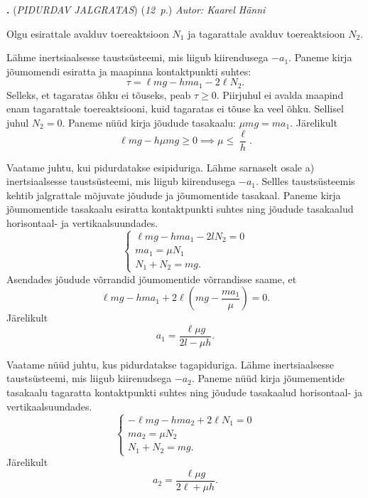 \documentclass[11pt,a5paper]{article}
\newcommand{\numb}[1]{\vspace{5pt}\textbf{\large #1}}
\newcommand{\nimi}[1]{(\textsl{\small #1})}
\newcommand{\punktid}[1]{(\emph{#1~p.})}
\newcounter{ylesanne}
\newcommand{\yl}[1]{\addtocounter{ylesanne}{1}\numb{\theylesanne.} \nimi{#1} \newblock{}}
\newcommand{\autor}[1]{\emph{ Autor: #1}}%
\begin{document}
\yl{PIDURDAV JALGRATAS}
\punktid{12} \autor{Kaarel Hänni}

Olgu esirattale avalduv toereaktsioon $N_1$ ja tagarattale avalduv toereaktsioon $N_2$.

\osa Lähme inertsiaalsesse taustsüsteemi, mis liigub kiirendusega $-a_1$. Paneme kirja jõumomendi esiratta ja maapinna kontaktpunkti suhtes:
\begin{equation}
  \tau=\ell mg-h m a_1 - 2\ell N_2.
\end{equation}
Selleks, et tagaratas õhku ei tõuseks, peab $\tau \geq 0$. Piirjuhul ei avalda maapind enam tagarattale toereaktsiooni, kuid tagaratas ei tõuse ka veel õhku. Sellisel juhul $N_2=0$. Paneme nüüd kirja jõudude tasakaalu: $\mu mg = m a_1$. Järelikult
\begin{equation}
\ell mg-h \mu mg \geq 0 \implies \mu \leq \frac{\ell}{h}.
\end{equation}

\osa Vaatame juhtu, kui pidurdatakse esipiduriga. Lähme sarnaselt osale a) inertsiaalsesse taustsüsteemi, mis liigub kiirendusega $-a_1$.  Sellles taustsüsteemis kehtib jalgrattale mõjuvate jõudude ja jõumomentide tasakaal. Paneme kirja jõumomentide tasakaalu esiratta kontaktpunkti suhtes ning jõudude tasakaalud horisontaal- ja vertikaalsuundades.
\begin{equation}
\begin{cases}
  \ell m g - h m a_1  - 2l N_2 =0 \\
  m a_1 = \mu N_1\\
  N_1 + N_2 = mg.
\end{cases}
\end{equation}
Asendades jõudude võrrandid jõumomentide võrrandisse saame, et
\begin{equation}
\ell m g -h m a_1 + 2 \ell \left( mg - \frac{m a_1}{\mu }\right) = 0.
\end{equation}
Järelikult
\begin{equation}
a_1=\frac{\ell \mu g}{2l - \mu h}.
\end{equation}

Vaatame nüüd juhtu, kus pidurdatakse tagapiduriga. Lähme inertsiaalsesse taustsüsteemi, mis liigub kiirenudsega $-a_2$. Paneme nüüd kirja jõumementide tasakaalu tagaratta kontaktpunkti suhtes ning jõudude tasakaalud horisontaal- ja vertikaalsuundades.
\begin{equation}
\begin{cases}
  - \ell m g - h m a_2  + 2\ell N_1 =0 \\
  m a_2 = \mu N_2\\
  N_1 + N_2 = mg.
\end{cases}
\end{equation}
Järelikult
\begin{equation}
a_2=\frac{\ell \mu g}{2\ell + \mu h}.
\end{equation}
\end{document}
